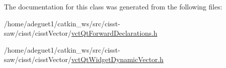 The documentation for this class was generated from the following files\-:\begin{DoxyCompactItemize}
\item 
/home/adeguet1/catkin\-\_\-ws/src/cisst-\/saw/cisst/cisst\-Vector/\hyperlink{vct_qt_forward_declarations_8h}{vct\-Qt\-Forward\-Declarations.\-h}\item 
/home/adeguet1/catkin\-\_\-ws/src/cisst-\/saw/cisst/cisst\-Vector/\hyperlink{vct_qt_widget_dynamic_vector_8h}{vct\-Qt\-Widget\-Dynamic\-Vector.\-h}\end{DoxyCompactItemize}
